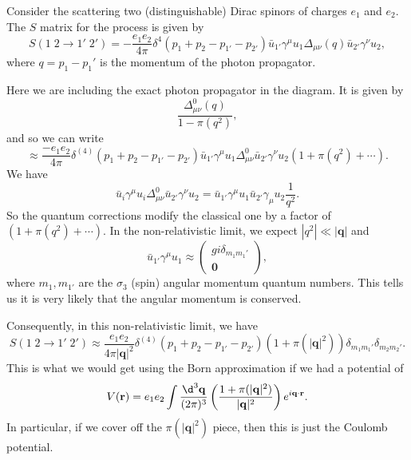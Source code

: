 \documentclass[a4paper]{article}
\begin{document}
Consider the  scattering two (distinguishable) Dirac spinors of charges $e_1$ and $e_2$. The $S$ matrix for the process is given by
\[
  S(1\; 2 \to 1'\;2') = - \frac{e_1e_2}{4\pi} \delta^4(p_1 + p_2 - p_{1'} - p_{2'})\bar{u}_{1'} \gamma^\mu u_1 \Delta_{\mu\nu}(q) \bar{u}_{2'} \gamma^\nu u_2,
\]
where $q = p_1 - p_1'$ is the momentum of the photon propagator.
\begin{center}
\end{center}
Here we are including the exact photon propagator in the diagram. It is given by
\[
  \frac{\Delta_{\mu\nu}^0(q)}{1 - \pi(q^2)},
\]
and so we can write
\[
  \approx \frac{-e_1 e_2}{4\pi} \delta^{(4)} (p_1 + p_2 - p_{1'} - p_{2'}) \bar{u}_{1'} \gamma^\mu u_1 \Delta_{\mu\nu}^0 \bar{u}_{2'} \gamma^\nu u_2 (1 + \pi(q^2) + \cdots).
\]
We have
\[
  \bar{u}_i \gamma^\mu u_i \Delta_{\mu\nu}^0\bar{u}_{2'} \gamma^\nu u_2 = \bar{u}_{1'} \gamma^\mu u_1 \bar{u}_{2'} \gamma_\mu u_2 \frac{1}{q^2}.
\]
So the quantum corrections modify the classical one by a factor of $(1 + \pi(q^2) + \cdots)$. In the non-relativistic limit, we expect $|q^2| \ll |\mathbf{q}|$ and
\[
  \bar{u}_{1'}\gamma^\mu u_1 \approx
  \begin{pmatrix}
    gi \delta_{m_1 m_1'}\\
    \mathbf{0}
  \end{pmatrix},
\]
where $m_1, m_{1'}$ are the $\sigma_3$ (spin) angular momentum quantum numbers. This tells us it is very likely that the angular momentum is conserved.

Consequently, in this non-relativistic limit, we have
\[
  S(1\;2 \to 1'\; 2') \approx \frac{e_1 e_2}{4\pi |\mathbf{q}|^2} \delta^{(4)} (p_1 + p_2 - p_{1'} - p_{2'}) (1 + \pi (|\mathbf{q}|^2)) \delta_{m_1 m_1'} \delta_{m_2 m_2'}.
\]
This is what we would get using the Born approximation if we had a potential of
\[
  V(\mathbf{r}) = e_1 e_2 \int \frac{\d^3 \mathbf{q}}{(2\pi)^3} \left(\frac{1 + \pi(|\mathbf{q}|^2)}{ |\mathbf{q}|^2}\right) e^{i\mathbf{q}\cdot \mathbf{r}}.
\]
In particular, if we cover off the $\pi(|\mathbf{q}|^2)$ piece, then this is just the Coulomb potential.
\end{document}
